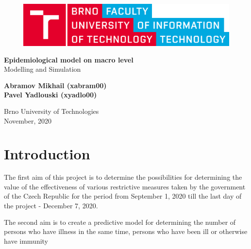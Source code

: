 \documentclass[12pt,a4paper,english]{article}
\newcommand{\todo}[1]{\textcolor{red}{[[\textbf{TODO} \textbf{#1]]}}}
\begin{document}
    \begin{titlepage}
        \begin{center}
            \vspace*{1cm}
        
            \begin{figure}[h!]
                \includegraphics[scale=0.12]{VUT-FIT-logo-en.png}
            \end{figure}
            \vspace{1.5cm}

            \Large{\textbf{Epidemiological model on macro level}} \\
            \large{Modelling and Simulation}

            \vspace{0.5cm}
                
            \vspace{1.5cm}
            
            \textbf{Abramov Mikhail (xabram00)} \\
            \textbf{Pavel Yadlouski (xyadlo00)} 

            \vfill
                
            \vspace{0.8cm}
        
            Brno University of Technologies\\
            November, 2020
                
        \end{center}
    \end{titlepage}

    \tableofcontents
    \newpage

    \section{Introduction}
    The first aim of this project is to determine the possibilities for determining the value of the effectiveness of various restrictive measures taken by the government of the Czech Republic for the period from September 1, 2020 till the last day of the project - December 7, 2020.

    The second aim is to create a predictive model for determining the number of persons who have illness in the same time, persons who have been ill or otherwise have immunity
    
\end{document}
